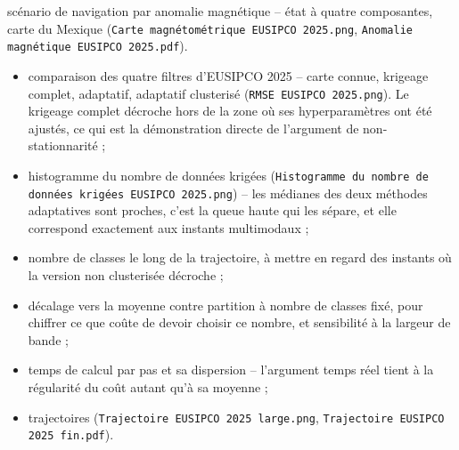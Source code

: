 {scénario de navigation par anomalie magnétique \cite{bib:magnetic-navigation} -- état à quatre composantes, carte du Mexique (\texttt{Carte magnétométrique EUSIPCO 2025.png}, \texttt{Anomalie magnétique EUSIPCO 2025.pdf}).}
\begin{itemize}
	\item comparaison des quatre filtres d'EUSIPCO 2025 -- carte connue, krigeage complet, adaptatif, adaptatif clusterisé (\texttt{RMSE EUSIPCO 2025.png}). Le krigeage complet décroche hors de la zone où ses hyperparamètres ont été ajustés, ce qui est la démonstration directe de l'argument de non-stationnarité ;
	\item histogramme du nombre de données krigées (\texttt{Histogramme du nombre de données krigées EUSIPCO 2025.png}) -- les médianes des deux méthodes adaptatives sont proches, c'est la queue haute qui les sépare, et elle correspond exactement aux instants multimodaux ;
	\item nombre de classes le long de la trajectoire, à mettre en regard des instants où la version non clusterisée décroche ;
	\item décalage vers la moyenne contre partition à nombre de classes fixé, pour chiffrer ce que coûte de devoir choisir ce nombre, et sensibilité à la largeur de bande ;
	\item temps de calcul par pas et sa dispersion -- l'argument temps réel tient à la régularité du coût autant qu'à sa moyenne ;
	\item trajectoires (\texttt{Trajectoire EUSIPCO 2025 large.png}, \texttt{Trajectoire EUSIPCO 2025 fin.pdf}).
\end{itemize}
